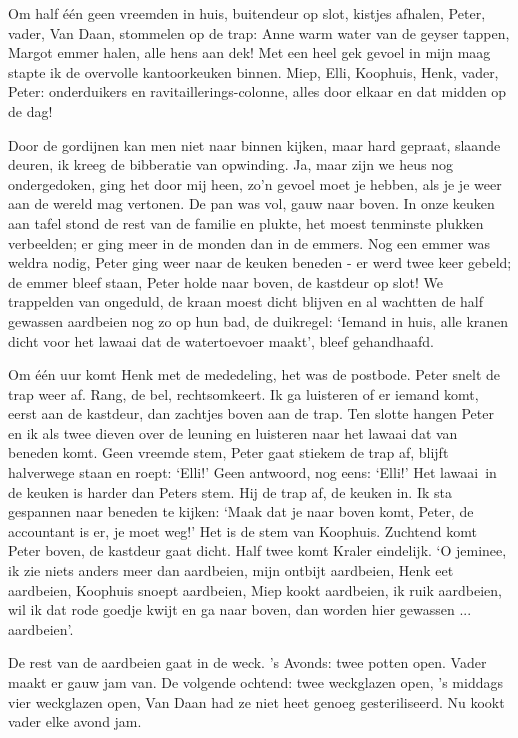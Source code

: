 \documentclass{book}
\begin{document}
Om half één geen vreemden in huis, buitendeur op slot, kistjes afhalen, Peter,
vader, Van Daan, stommelen op de trap: Anne warm water van de geyser tappen,
Margot emmer halen, alle hens aan dek! Met een heel gek gevoel in mijn maag
stapte ik de overvolle kantoorkeuken binnen. Miep, Elli, Koophuis, Henk, vader,
Peter: onderduikers en ravitaillerings-colonne, alles door elkaar en dat midden
op de dag!

Door de gordijnen kan men niet naar binnen kijken, maar hard gepraat, slaande
deuren, ik kreeg de bibberatie van opwinding. Ja, maar zijn we heus nog
ondergedoken, ging het door mij heen, zo'n gevoel moet je hebben, als je je weer
aan de wereld mag vertonen. De pan was vol, gauw naar boven. In onze keuken aan
tafel stond de rest van de familie en plukte, het moest tenminste plukken
verbeelden; er ging meer in de monden dan in de emmers. Nog een emmer was weldra
nodig, Peter ging weer naar de keuken beneden - er werd twee keer gebeld; de
emmer bleef staan, Peter holde naar boven, de kastdeur op slot! We trappelden
van ongeduld, de kraan moest dicht blijven en al wachtten de half gewassen
aardbeien nog zo op hun bad, de duikregel: `Iemand in huis, alle kranen dicht
voor het lawaai dat de watertoevoer maakt', bleef gehandhaafd.

Om één uur komt Henk met de mededeling, het was de postbode. Peter snelt de trap
weer af. Rang, de bel, rechtsomkeert. Ik ga luisteren of er iemand komt, eerst
aan de kastdeur, dan zachtjes boven aan de trap. Ten slotte hangen Peter en ik
als twee dieven over de leuning en luisteren naar het lawaai dat van beneden
komt. Geen vreemde stem, Peter gaat stiekem de trap af, blijft halverwege staan
en roept: `Elli!' Geen antwoord, nog eens: `Elli!' Het lawaai~in de keuken is
harder dan Peters stem. Hij de trap af, de keuken in. Ik sta gespannen naar
beneden te kijken: `Maak dat je naar boven komt, Peter, de accountant is er, je
moet weg!' Het is de stem van Koophuis. Zuchtend komt Peter boven, de kastdeur
gaat dicht. Half twee komt Kraler eindelijk. `O jeminee, ik zie niets anders
meer dan aardbeien, mijn ontbijt aardbeien, Henk eet aardbeien, Koophuis snoept
aardbeien, Miep kookt aardbeien, ik ruik aardbeien, wil ik dat rode goedje kwijt
en ga naar boven, dan worden hier gewassen ... aardbeien'.

De rest van de aardbeien gaat in de weck. 's Avonds: twee potten open.  Vader
maakt er gauw jam van. De volgende ochtend: twee weckglazen open, 's middags
vier weckglazen open, Van Daan had ze niet heet genoeg gesteriliseerd. Nu kookt
vader elke avond jam.
\end{document}
